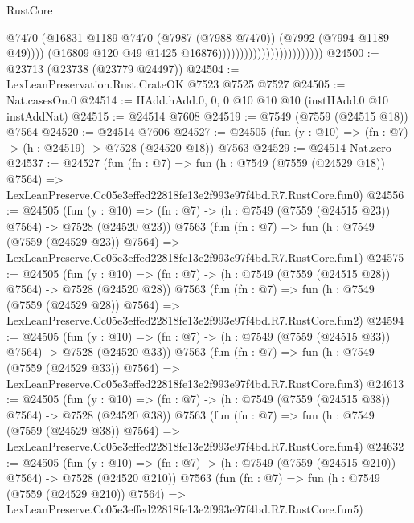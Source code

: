 \begin{lexlean}{RustCore}
\begin{coremodule}
                                                    @7470
                                                    (@16831
                                                      @1189
                                                      @7470
                                                      (@7987 (@7988 @7470))
                                                      (@7992 (@7994 @1189 @49))))
                                                  (@16809
                                                    @120
                                                    @49
                                                    @1425
                                                    @16876))))))))))))))))))))))))
@24500 := @23713 (@23738 (@23779 @24497))
@24504 := LexLeanPreservation.Rust.CrateOK @7523 @7525 @7527
@24505 := Nat.casesOn.{0}
@24514 := HAdd.hAdd.{0, 0, 0} @10 @10 @10 (instHAdd.{0} @10 instAddNat)
@24515 := @24514 @7608
@24519 := @7549 (@7559 (@24515 @18)) @7564
@24520 := @24514 @7606
@24527 := @24505 (fun (y : @10) => (fn : @7) -> (h : @24519) -> @7528 (@24520 @18)) @7563
@24529 := @24514 Nat.zero
@24537 := @24527
    (fun (fn : @7) =>
    fun (h : @7549 (@7559 (@24529 @18)) @7564) =>
    LexLeanPreserve.Cc05e3effed22818fe13e2f993e97f4bd.R7.RustCore.fun0)
@24556 := @24505
    (fun (y : @10) => (fn : @7) -> (h : @7549 (@7559 (@24515 @23)) @7564) -> @7528 (@24520 @23))
    @7563
    (fun (fn : @7) =>
    fun (h : @7549 (@7559 (@24529 @23)) @7564) =>
    LexLeanPreserve.Cc05e3effed22818fe13e2f993e97f4bd.R7.RustCore.fun1)
@24575 := @24505
    (fun (y : @10) => (fn : @7) -> (h : @7549 (@7559 (@24515 @28)) @7564) -> @7528 (@24520 @28))
    @7563
    (fun (fn : @7) =>
    fun (h : @7549 (@7559 (@24529 @28)) @7564) =>
    LexLeanPreserve.Cc05e3effed22818fe13e2f993e97f4bd.R7.RustCore.fun2)
@24594 := @24505
    (fun (y : @10) => (fn : @7) -> (h : @7549 (@7559 (@24515 @33)) @7564) -> @7528 (@24520 @33))
    @7563
    (fun (fn : @7) =>
    fun (h : @7549 (@7559 (@24529 @33)) @7564) =>
    LexLeanPreserve.Cc05e3effed22818fe13e2f993e97f4bd.R7.RustCore.fun3)
@24613 := @24505
    (fun (y : @10) => (fn : @7) -> (h : @7549 (@7559 (@24515 @38)) @7564) -> @7528 (@24520 @38))
    @7563
    (fun (fn : @7) =>
    fun (h : @7549 (@7559 (@24529 @38)) @7564) =>
    LexLeanPreserve.Cc05e3effed22818fe13e2f993e97f4bd.R7.RustCore.fun4)
@24632 := @24505
    (fun (y : @10) => (fn : @7) -> (h : @7549 (@7559 (@24515 @210)) @7564) -> @7528 (@24520 @210))
    @7563
    (fun (fn : @7) =>
    fun (h : @7549 (@7559 (@24529 @210)) @7564) =>
    LexLeanPreserve.Cc05e3effed22818fe13e2f993e97f4bd.R7.RustCore.fun5)

\end{coremodule}
\end{lexlean}
